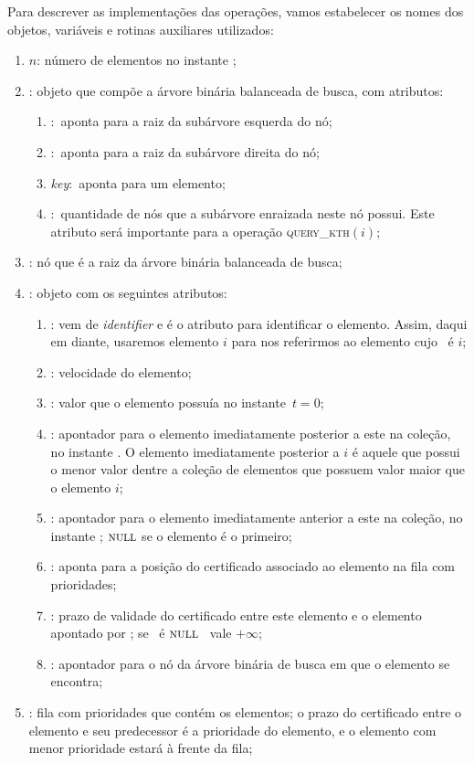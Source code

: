 Para descrever as implementações das operações, vamos
estabelecer os nomes dos objetos, variáveis e rotinas
auxiliares utilizados:
\begin{enumerate}
    \item $n$: número de elementos no instante \now;
    \item \no: objeto que compõe a árvore binária balanceada
    de busca, com atributos:
    \begin{enumerate}
        \item \esq$:$ aponta para a raiz da subárvore
        esquerda do nó;
        \item \dir$:$ aponta para a raiz da subárvore
        direita do nó;
        \item \textit{key}$:$ aponta para um elemento;
        \item \children$:$ quantidade de nós que a subárvore
        enraizada neste nó possui.
        Este atributo será importante para a operação \textsc{query\_kth}$(i)$;
    \end{enumerate}
    \item \raiz: nó que é a raiz da árvore binária balanceada de
    busca;
    \item \elemento: objeto com os seguintes atributos:
    \begin{enumerate}
        \item \id: vem de \textit{identifier} e é o atributo
        para identificar o elemento.
        Assim, daqui em diante, usaremos elemento $i$ para nos
        referirmos ao elemento cujo \id~é $i$;
        \item \speed: velocidade do elemento;
        \item \initv: valor que o elemento possuía no
        instante~$t = 0$;
        \item \nex: apontador para o elemento imediatamente
        posterior a este na coleção, no instante \now.
        O elemento imediatamente posterior a $i$ é aquele
        que possui o menor valor dentre a coleção de
        elementos que possuem valor maior que o elemento
        $i$;
        \item \prev: apontador para o elemento imediatamente
        anterior a este na coleção, no instante \now; $\textsc{null}$ se o elemento é o primeiro;
        \item \pqpos: aponta para a posição do certificado associado
        ao elemento na fila com prioridades;
        \item \cert: prazo de validade do certificado entre este elemento e o elemento
        apontado por \prev; se \prev~é $\textsc{null}$ \cert~vale $+\infty$;
        \item \no: apontador para o nó da árvore binária de busca em
        que o elemento se encontra;
    \end{enumerate}
    \item \Q: fila com prioridades que contém os elementos;
    o prazo do certificado entre o elemento e seu predecessor é a prioridade do elemento, e o
    elemento com menor prioridade estará à frente da fila;


\end{enumerate}

